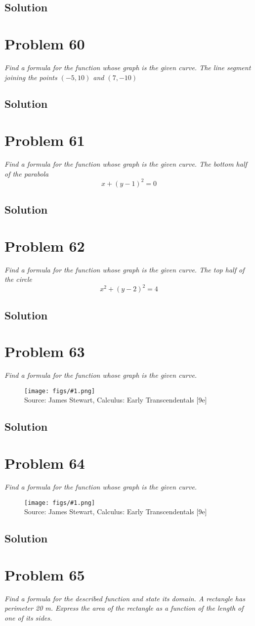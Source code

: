 \documentclass[11pt]{article}
\newcommand{\soln}{\subsection*}
\newcommand{\qn}{\textit}
\newcommand{\imagesource}[1]{{\footnotesize Source: #1}}
\newcommand{\imgqn}[1]{
	\begin{figure}[h]
		\centering
		\texttt{[image: figs/\#1.png]}\\
		\imagesource{James Stewart, Calculus: Early Transcendentals [9e]}
	\end{figure}
}
\begin{document}
\soln{Solution}

\section*{Problem 60}

\qn{Find a formula for the function whose graph is the given curve. The line segment joining the points $(-5, 10)$ and $(7, -10)$}

\soln{Solution}

\section*{Problem 61}

\qn{Find a formula for the function whose graph is the given curve. The bottom half of the parabola $$x+(y-1)^2=0$$ }

\soln{Solution}

\section*{Problem 62}

\qn{Find a formula for the function whose graph is the given curve. The top half of the circle $$x^2+(y-2)^2=4$$}

\soln{Solution}

\section*{Problem 63}

\qn{Find a formula for the function whose graph is the given curve.}

\imgqn{1.1.63}

\soln{Solution}

\section*{Problem 64}

\qn{Find a formula for the function whose graph is the given curve.}

\imgqn{1.1.64}

\soln{Solution}

\section*{Problem 65}

\qn{Find a formula for the described function and state its domain. A rectangle has perimeter 20 m. Express the area of the rectangle as a function of the length of one of its sides.}
\end{document}
